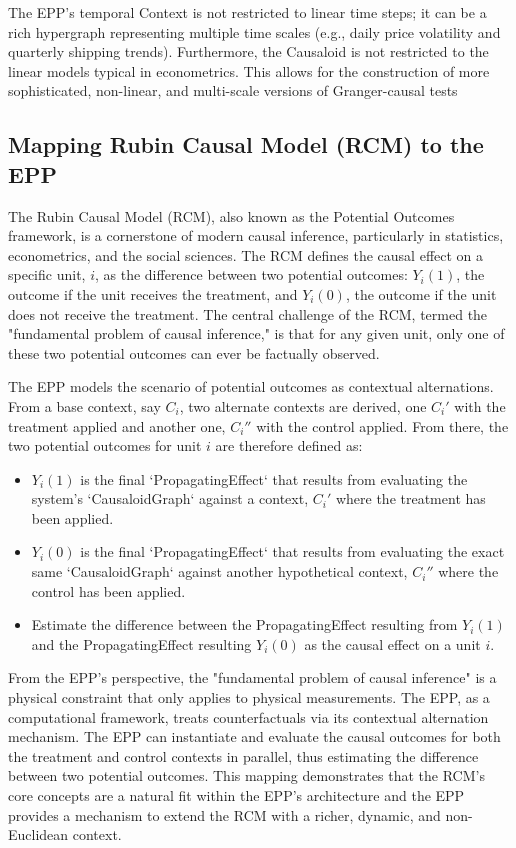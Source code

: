 The EPP's temporal Context is not restricted to linear time steps; it can be a rich hypergraph representing multiple time scales (e.g., daily price volatility and quarterly shipping trends). Furthermore, the Causaloid is not restricted to the linear models typical in econometrics. This allows for the construction of more sophisticated, non-linear, and multi-scale versions of Granger-causal tests

%
%
\subsection{Mapping Rubin Causal Model (RCM) to the EPP}
\label{sec:epp_rubin_causal_model}

The Rubin Causal Model (RCM), also known as the Potential Outcomes framework, is a cornerstone of modern causal inference, particularly in statistics, econometrics, and the social sciences. The RCM defines the causal effect on a specific unit, $i$, as the difference between two potential outcomes: $Y_{i}(1)$, the outcome if the unit receives the treatment, and $Y_{i}(0)$,  the outcome if the unit does not receive the treatment. The central challenge of the RCM, termed the "fundamental problem of causal inference," is that for any given unit, only one of these two potential outcomes can ever be factually observed.  

The EPP models the scenario of potential outcomes as contextual alternations. From a base context, say $C_i$, two alternate contexts are derived, one $C_i'$  with the treatment applied and another one,  $C_i''$ with the control applied. From there, the two potential outcomes for unit $i$ are therefore defined as:

\begin{itemize}
	\item  $Y_i(1)$ is the final `PropagatingEffect` that results from evaluating the system's `CausaloidGraph` against a context, $C_i'$ where the treatment has been applied.
	\item $Y_i(0)$ is the final `PropagatingEffect` that results from evaluating the exact same `CausaloidGraph` against another hypothetical context, $C_i''$ where the control has been applied.
	\item Estimate the difference between the PropagatingEffect resulting from $Y_i(1)$  and the PropagatingEffect resulting $Y_i(0)$ as the causal effect on a unit $i$. 
\end{itemize}

From the EPP's perspective, the "fundamental problem of causal inference" is a physical constraint that only applies to physical measurements. The EPP, as a computational framework, treats counterfactuals via its contextual alternation mechanism. The EPP can instantiate and evaluate the causal outcomes for both the treatment and control contexts in parallel, thus estimating the difference between two potential outcomes. This mapping demonstrates that the RCM's core concepts are a natural fit within the EPP's architecture and the EPP provides a mechanism to extend the RCM with a richer, dynamic, and non-Euclidean context.

